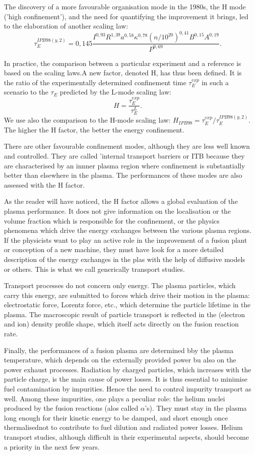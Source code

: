 The discovery of a more favourable organisation mode in the 1980s, the H mode ('high confinement'), and the need for quantifying the improvement it brings, led to the elaboration of another scaling law:
\[
\tau_E^{IPB98(y,2)} = 0,145 \frac{I^{0,93}R^{1,39}a^{0,58}\kappa^{0,78}(n/10^{20})^{0,41}B^{0,15}A^{0,19}}{P^{0,69}}.
\]

In practice, the comparison between a particular experiment and a reference is based on the scaling laws.A new factor, denoted H, has thus been defined. It is the ratio of the experimentally determined confinement time $\tau_E^{exp}$ in such a scenario to the $\tau_E$ predicted by the L-mode scaling law:
\[
H = \frac{\tau_E^{exp}}{\tau_E^L}.
\] 
We use also the comparison to the H-mode scaling law: $H_{IPB98} = \tau_E^{exp} / \tau_E^{IPB98(y,2)}$. The higher the H factor, the better the energy confinement.

There are other favourable confinement modes, although they are less well known and controlled. They are called 'internal transport barriers or ITB because they are characterised by an innner plasma region where confinement is substantially better than elsewhere in the plasma. The performances of these modes are also assessed with the H factor.

As the reader will have noticed, the H factor allows a global evaluation of the plasma performance. It does not give information on the localisation or the volume fraction which is responsible for the confinement, or the physics phenomena which drive the energy exchanges between the various plasma regions. If the physicists want to play an active role in the improvement of a fusion plant or conception of a new machine, they must have look for a more detailed description of the energy exchanges in the plas with the help of diffusive models or others. This is what we call generically transport studies.

Transport processes do not concern only energy. The plasma particles, which carry this energy, are submitted to forces which drive their motion in the plasma: electrostatic force, Lorentz force, etc., which determine the particle lifetime in the plasma. The macroscopic result of particle transport is reflected in the (electron and ion) density profile shape, which itself acts directly on the fusion reaction rate.

Finally, the performances of a fusion plasma are determined bby the plasma temperature, which depends on the externally provided power bu also on the power exhaust processes. Radiation by charged particles, which increases with the particle charge, is the main cause of power losses. It is thus essential to minimise fuel contamination by impurities. Hence the need to control impurity transport as well. Among these impurities, one plays a peculiar role: the helium nuclei produced by the fusion reactions (alos called $\alpha$'s). They must stay in the plasma long enough for their kinetic energy to be damped, and short enough once thermalisednot to contribute to fuel dilution and radiated power losses. Helium transport studies, although difficult in their experimental aspects, should become a priority in the next few years.

